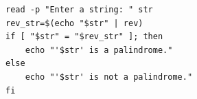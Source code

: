 \begin{verbatim}
read -p "Enter a string: " str
rev_str=$(echo "$str" | rev)
if [ "$str" = "$rev_str" ]; then
    echo "'$str' is a palindrome."
else
    echo "'$str' is not a palindrome."
fi
\end{verbatim}